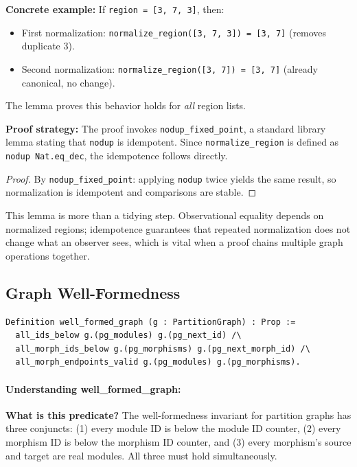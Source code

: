\textbf{Concrete example:} If \texttt{region = [3, 7, 3]}, then:
\begin{itemize}
    \item First normalization: \texttt{normalize\_region([3, 7, 3]) = [3, 7]} (removes duplicate 3).
    \item Second normalization: \texttt{normalize\_region([3, 7]) = [3, 7]} (already canonical, no change).
\end{itemize}
The lemma proves this behavior holds for \textit{all} region lists.

\textbf{Proof strategy:} The proof invokes \texttt{nodup\_fixed\_point}, a standard library lemma stating that \texttt{nodup} is idempotent. Since \texttt{normalize\_region} is defined as \texttt{nodup Nat.eq\_dec}, the idempotence follows directly.


\begin{proof}
By \texttt{nodup\_fixed\_point}: applying \texttt{nodup} twice yields the same result, so normalization is idempotent and comparisons are stable.
\end{proof}
This lemma is more than a tidying step. Observational equality depends on normalized regions; idempotence guarantees that repeated normalization does not change what an observer sees, which is vital when a proof chains multiple graph operations together.

\subsection{Graph Well-Formedness}

\begin{lstlisting}
Definition well_formed_graph (g : PartitionGraph) : Prop :=
  all_ids_below g.(pg_modules) g.(pg_next_id) /\
  all_morph_ids_below g.(pg_morphisms) g.(pg_next_morph_id) /\
  all_morph_endpoints_valid g.(pg_modules) g.(pg_morphisms).
\end{lstlisting}

\paragraph{Understanding well\_formed\_graph:}

\textbf{What is this predicate?} The well-formedness invariant for partition graphs has three conjuncts: (1) every module ID is below the module ID counter, (2) every morphism ID is below the morphism ID counter, and (3) every morphism's source and target are real modules. All three must hold simultaneously.


